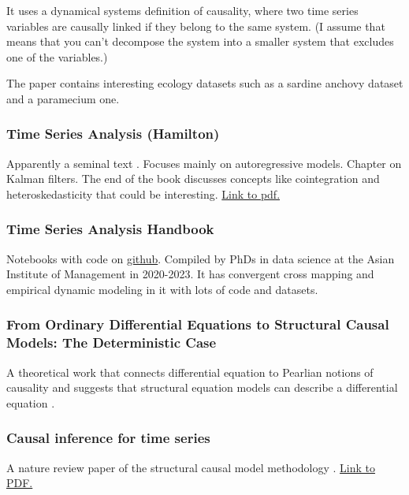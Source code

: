 \documentclass{article}
\begin{document}
        It uses a dynamical systems definition of causality, where two time
        series variables are causally linked if they belong to the same system. (I assume that means 
        that you can't decompose the system into a smaller system that excludes one of the variables.)

        The paper contains interesting ecology datasets such as a sardine anchovy dataset and 
        a paramecium one.

    \subsubsection*{Time Series Analysis (Hamilton)}

        Apparently a seminal text \cite{hamilton1994time}. Focuses mainly on autoregressive models.
        Chapter on Kalman filters. The end of the book discusses concepts like
        cointegration and heteroskedasticity that could be interesting.
        \href{http://mayoral.iae-csic.org/timeseries2021/hamilton.pdf}{Link to pdf.}

    \subsubsection*{Time Series Analysis Handbook}

        Notebooks with code on \href{https://phdinds-aim.github.io/time_series_handbook/Preface/Preface.html}{github}.
        Compiled by PhDs in data science at the Asian Institute of Management in 2020-2023.
        It has convergent cross mapping and empirical dynamic modeling in it with lots of code and datasets.

    \subsubsection*{From Ordinary Differential Equations to Structural Causal Models: The Deterministic Case}
        
        A theoretical work that connects differential equation to Pearlian notions of causality
        and suggests that structural equation models can describe a differential equation \cite{mooij2013ordinary}.

    \subsubsection*{Causal inference for time series}
        
        A nature review paper of the structural causal model methodology \cite{runge2023causal}.
        \href{https://climateinformaticslab.com/wp-content/uploads/2023/06/Runge_Causal_Inference_for_Time_Series_NREE.pdf}
        {Link to PDF.}
\end{document}
